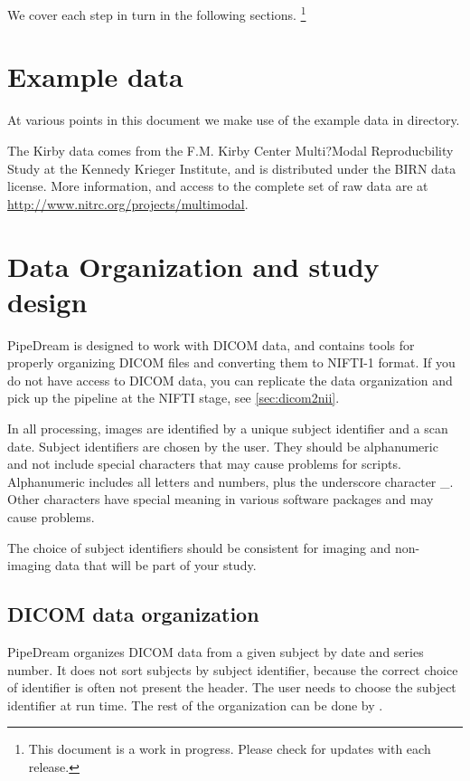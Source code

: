 \documentclass{InsightArticle}
\begin{document}
We cover each step in turn in the following sections. \footnote{This document is a work in progress. Please check for updates with each release.}

\section{Example data}

At various points in this document we make use of the example data in  directory.


The Kirby data comes from the F.M. Kirby Center Multi?Modal Reproducbility Study at the Kennedy Krieger Institute, and is distributed under the BIRN data license. More information, and access to the complete set of raw data are at \url{http://www.nitrc.org/projects/multimodal}. 





\section{Data Organization and study design}

PipeDream is designed to work with DICOM data, and contains tools for properly organizing DICOM files and converting them to NIFTI-1 format. If you do not have access to DICOM data, you can replicate the data organization and pick up the pipeline at the NIFTI stage, see \ref{sec:dicom2nii}.

In all processing, images are identified by a unique subject identifier and a scan date. Subject identifiers are chosen by the user. They should be alphanumeric and not include special characters that may cause problems for scripts. Alphanumeric includes all letters and numbers, plus the underscore character \_. Other characters have special meaning in various software packages and may cause problems. 

The choice of subject identifiers should be consistent for imaging and non-imaging data that will be part of your study. 


\subsection{DICOM data organization}

PipeDream organizes DICOM data from a given subject by date and series number. It does not sort subjects by subject identifier, because the correct choice of identifier is often not present the header. The user needs to choose the subject identifier at run time. The rest of the organization can be done by .
\end{document}

